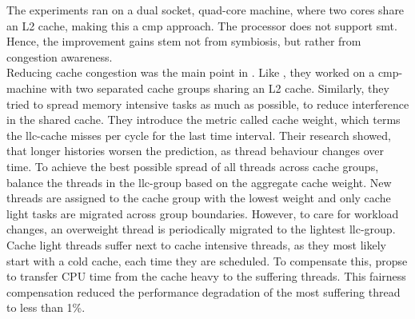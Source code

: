 The experiments ran on a dual socket, quad-core machine, where two cores
share an L2 cache, making this a \gls{cmp} approach.
The processor does not support \gls{smt}.
Hence, the improvement gains stem not from symbiosis, but rather from
congestion awareness.
\\

Reducing cache congestion was the main point in \cite{knauerhase_using_2008}.
Like \citeauthor{banikazemi_pam_2008}, they worked on a \gls{cmp}-machine with
two separated cache groups sharing an L2 cache.
Similarly, they tried to spread memory intensive tasks as much as possible,
to reduce interference in the shared cache.
They introduce the metric called cache weight, which terms the \gls{llc}-cache
misses per cycle for the last time interval.
Their research showed, that longer histories worsen the prediction, as thread
behaviour changes over time.
To achieve the best possible spread of all threads across cache groups,
\citeauthor{knauerhase_using_2008} balance the threads in the \gls{llc}-group
based on the aggregate cache weight.
New threads are assigned to the cache group with the lowest weight and only
cache light tasks are migrated across group boundaries.
However, to care for workload changes, an overweight thread is periodically
migrated to the lightest \gls{llc}-group.
Cache light threads suffer next to cache intensive threads, as they most likely
start with a cold cache, each time they are scheduled.
To compensate this, \citeauthor{knauerhase_using_2008} propse to transfer CPU
time from the cache heavy to the suffering threads.
This fairness compensation reduced the performance degradation of the most
suffering thread to less than 1\%.
\\


